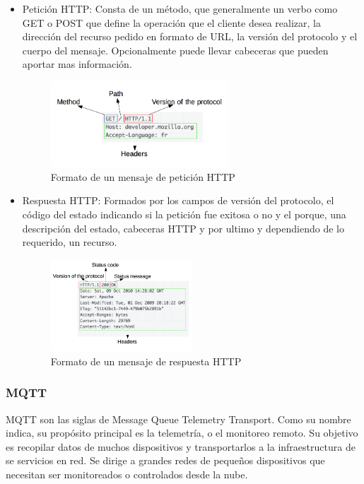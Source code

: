 \begin{itemize}
\item Petición HTTP: Consta de un método, que generalmente un verbo como GET o POST que define la operación que el cliente desea realizar, la dirección del recurso pedido en formato de URL, la versión del protocolo y el cuerpo del mensaje. Opcionalmente puede llevar cabeceras que pueden aportar mas información. 

\begin{figure}[ht]
\centering
\includegraphics[width=0.625\textwidth]{Figuras/HTTP_Request.png}
\caption{\label{fig:httprequest}Formato de un mensaje de petición HTTP}
\vspace*{-15pt}
\end{figure}

\item Respuesta HTTP: Formados por los campos de versión del protocolo, el código del estado indicando si la petición fue exitosa o no y el porque, una descripción del estado, cabeceras HTTP y por ultimo y dependiendo de lo requerido, un recurso.

\begin{figure}[ht]
\centering
\includegraphics[width=0.5\textwidth]{Figuras/HTTP_Response.png}
\caption{\label{fig:httpresponse}Formato de un mensaje de respuesta HTTP}
\vspace*{-15pt}
\end{figure}

\end{itemize}

\subsubsection{MQTT}
MQTT son las siglas de Message Queue Telemetry Transport. Como su nombre indica, su propósito principal es la telemetría, o el monitoreo remoto. Su objetivo es recopilar datos de muchos dispositivos y transportarlos a la infraestructura de se servicios en red. Se dirige a grandes redes de pequeños dispositivos que necesitan ser monitoreados o controlados desde la nube.\cite{iotprotocols}\\

